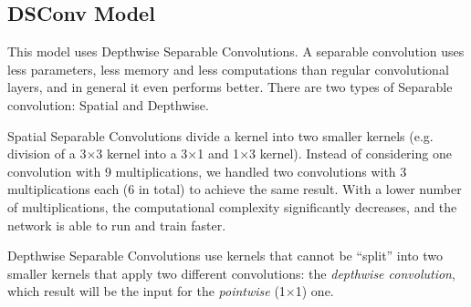 \documentclass[conference]{IEEEtran}
\begin{document}
\subsection{DSConv Model}
This model uses Depthwise Separable Convolutions. A separable convolution uses less parameters, less memory and less computations than regular convolutional layers, and in general it even performs better.
There are two types of Separable convolution: Spatial and Depthwise.

Spatial Separable Convolutions divide a kernel into two smaller kernels (e.g. division of a 3$\times$3 kernel into a 3$\times$1 and 1$\times$3 kernel). Instead of considering one convolution with 9 multiplications, we handled two convolutions with 3 multiplications each (6 in total) to achieve the same result. With a lower number of multiplications, the computational complexity significantly decreases, and the network is able to run and train faster.

Depthwise Separable Convolutions use kernels that cannot be “split” into two smaller kernels that apply two different convolutions: the \textit{depthwise convolution}, which result will be the input for the \textit{pointwise} (1$\times$1) one.
\end{document}
